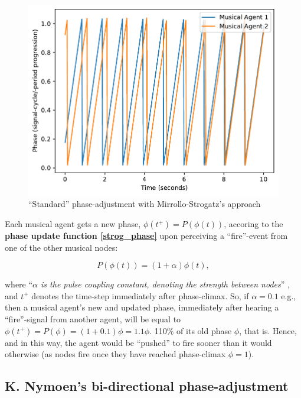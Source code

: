 	\begin{figure}[h]
		\centering
		\includegraphics[width=0.9\linewidth]{Assets/Figures/MirolloStrogatzPhaseAdjustment.pdf}
		\caption{``Standard'' phase-adjustment with Mirrollo-Strogatz's approach}
		\label{fig:strog_phase}
	\end{figure}
	
	Each musical agent gets a new phase, $\phi(t^+) = P(\phi(t))$, accoring to the \textbf{phase update function \eqref{strog_phase}} upon perceiving a ``fire''-event from one of the other musical nodes:
	
	\begin{equation}\label{strog_phase}
	P(\phi(t)) = (1 + \alpha)\phi(t)	,
	\end{equation}
	
	where ``\textit{$\alpha$ is the pulse coupling constant, denoting the strength between nodes}'' \cite{nymoen_synch}, and $t^+$ denotes the time-step immediately after phase-climax. So, if $\alpha = 0.1$ e.g., then a musical agent's new and updated phase, immediately after hearing a ``fire''-signal from another agent, will be equal to $\phi(t^+) = P(\phi) = (1 + 0.1)\phi = 1.1\phi$. 110\% of its old phase $\phi$, that is. Hence, and in this way, the agent would be ``pushed'' to fire sooner than it would otherwise (as nodes fire once they have reached phase-climax $\phi=1$).
		
	
	
	
	\subsection{K. Nymoen's bi-directional phase-adjustment} %
	
